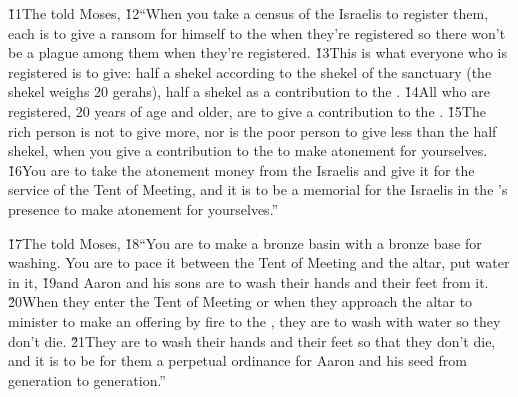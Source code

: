 \v{11}The  told Moses, \v{12}``When you take a census of the Israelis to register them, each is to give a ransom for himself to the  when they're registered so there won't be a plague among them when they're registered. \v{13}This is what everyone who is registered is to give: half a shekel according to the shekel of the sanctuary (the shekel weighs 20 gerahs), half a shekel as a contribution to the . \v{14}All who are registered, 20 years of age and older, are to give a contribution to the . \v{15}The rich person is not to give more, nor is the poor person to give less than the half shekel, when you give a contribution to the  to make atonement for yourselves. \v{16}You are to take the atonement money from the Israelis and give it for the service of the Tent of Meeting, and it is to be a memorial for the Israelis in the 's presence to make atonement for yourselves.''

\v{17}The  told Moses, \v{18}``You are to make a bronze basin with a bronze base for washing. You are to pace it between the Tent of Meeting and the altar, put water in it, \v{19}and Aaron and his sons are to wash their hands and their feet from it. \v{20}When they enter the Tent of Meeting or when they approach the altar to minister to make an offering by fire to the , they are to wash with water so they don't die. \v{21}They are to wash their hands and their feet so that they don't die, and it is to be for them a perpetual ordinance for Aaron and his seed from generation to generation.''

